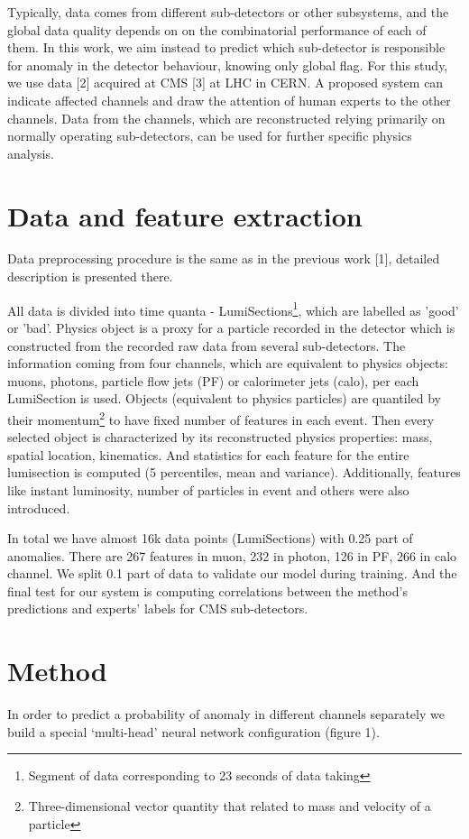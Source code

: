 \documentclass[a4paper]{jpconf}
\begin{document}
Typically, data comes from different sub-detectors or other subsystems, and the global data quality depends on on the combinatorial performance of each of them. In this work, we aim instead to predict which sub-detector is responsible for anomaly in the detector behaviour, knowing only global flag. For this study, we use data [2] acquired at CMS [3] at LHC in CERN. A proposed system can indicate affected channels and draw the attention of human experts to the other channels. Data from the channels, which are reconstructed relying primarily on normally operating sub-detectors, can be used for further specific physics analysis.


\section{Data and feature extraction}
Data preprocessing procedure is the same as in the previous work [1], detailed description is presented there. 

All data is divided into time quanta - LumiSections\footnote{Segment of data corresponding to 23 seconds of data taking}, which are labelled as 'good' or 'bad'. Physics object is a proxy for a particle recorded in the detector which is constructed from the recorded raw data from several sub-detectors. The information coming from four channels, which are equivalent to physics objects: muons, photons, particle flow jets (PF) or calorimeter jets (calo), per each LumiSection is used. Objects (equivalent to physics particles) are quantiled by their momentum\footnote{Three-dimensional vector quantity that related to mass and velocity of a particle} to have fixed number of features in each event. Then every selected object is characterized by its reconstructed physics properties: mass, spatial location, kinematics. And statistics for each feature for the entire lumisection is computed (5 percentiles, mean and variance). 
Additionally, features like instant luminosity, number of particles in event and others were also introduced.

In total we have almost 16k data points (LumiSections) with 0.25 part of anomalies. There are 267 features in muon, 232 in photon, 126 in PF, 266 in calo channel. We split 0.1 part of data to validate our model during training. And the final test for our system is computing correlations between the method's predictions and experts’ labels for CMS sub-detectors.

\section{Method}
In order to predict a probability of anomaly in different channels separately 
we build a special ‘multi-head’ neural network configuration (figure 1). 
\end{document}
